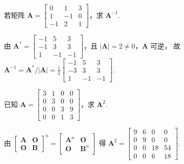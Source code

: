 \begin{problem}[本题6分]
  若矩阵 $\mathbf A = 
  \begin{bmatrix}
    0 & 1 & 3 \\
    1 & -1 & 0 \\
    -1 & 2 &1 
  \end{bmatrix} $，求 $\mathbf A^{-1}$.
\end{problem}
\scratch[8ex]
\begin{solution}
  由 $\mathbf A^* =
  \begin{bmatrix}
    -1 & 5  & 3 \\
    -1 & 3  & 3\\
    1  & -1 & -1
  \end{bmatrix}$，且 $|\mathbf A| = 2\neq 0$，$\mathbf A$ 可逆，
  故 $\mathbf A^{-1} = \mathbf A^*/|\mathbf A| = \frac12
  \begin{bmatrix}
    -1 & 5  &  3\\
    -3 & 3  &  3\\
    1  & -1 & -1
  \end{bmatrix}$.
\end{solution}

\begin{problem}[本题6分]
  已知 $\mathbf A =
  \begin{bmatrix}
    3 & 1 & 0 & 0\\
    0 & 3 & 0 & 0\\
    0 & 0 & 3 & 9\\
    0 & 0 & 1 & 3
  \end{bmatrix}$，求 $\mathbf A^2$.
\end{problem}
\scratch[8ex]
\begin{solution}
  由 $
  \begin{bmatrix}
    \mathbf A & \mathbf O\\\mathbf O & \mathbf B
  \end{bmatrix}^{n} =
  \begin{bmatrix}
    \mathbf A^n & \mathbf O\\
    \mathbf O   & \mathbf B^n
  \end{bmatrix}$ 得 $\mathbf A^2 =
  \begin{bmatrix}
    9 & 6 & 0 & 0\\
    0 & 9 & 0 & 0\\
    0 & 0 & 18& 54\\
    0 & 0 & 6 & 18
  \end{bmatrix}$.
\end{solution}

